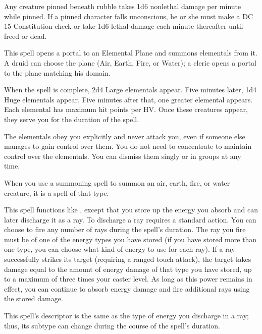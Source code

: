 \begin{spellnotes}
  Any creature pinned beneath rubble takes 1d6 nonlethal damage per minute while pinned. If a pinned character falls unconscious, he or she must make a DC 15 Constitution check or take 1d6 lethal damage each minute thereafter until freed or dead.
\end{spellnotes}

\spellrng{\rngmed}
\begin{spelleffect}
  This spell opens a portal to an Elemental Plane and summons elementals from it. A druid can choose the plane (Air, Earth, Fire, or Water); a cleric opens a portal to the plane matching his domain.
  \par When the spell is complete, 2d4 Large elementals appear. Five minutes later, 1d4 Huge elementals appear. Five minutes after that, one greater elemental appears. Each elemental has maximum hit points per HV. Once these creatures appear, they serve you for the duration of the spell.
  \par The elementals obey you explicitly and never attack you, even if someone else manages to gain control over them. You do not need to concentrate to maintain control over the elementals. You can dismiss them singly or in groups at any time.
  \par When you use a summoning spell to summon an air, earth, fire, or water creature, it is a spell of that type.
\end{spelleffect}

\begin{spelleffect}
  This spell functions like , except that you store up the energy you absorb and can later discharge it as a ray. To discharge a ray requires a standard action. You can choose to fire any number of rays during the spell's duration. The ray you fire must be of one of the energy types you have stored (if you have stored more than one type, you can choose what kind of energy to use for each ray). If a ray successfully strikes its target (requiring a ranged touch attack), the target takes damage equal to the amount of energy damage of that type you have stored, up to a maximum of three times your caster level. As long as this power remains in effect, you can continue to absorb energy damage and fire additional rays using the stored damage.
\end{spelleffect}
\begin{spellnotes}
  This spell's descriptor is the same as the type of energy you discharge in a ray; thus, its subtype can change during the course of the spell's duration.
\end{spellnotes}

